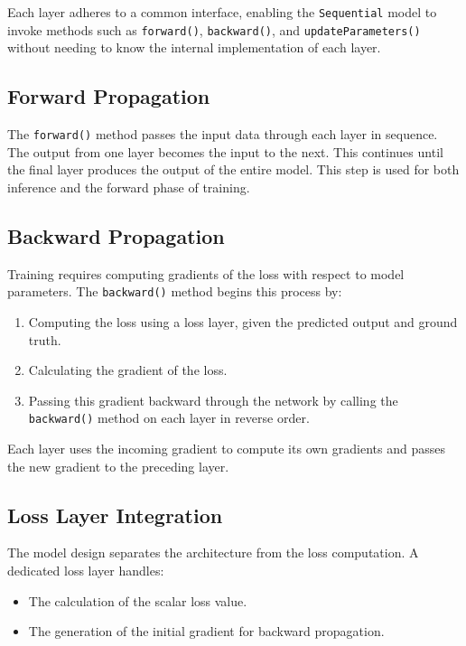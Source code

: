 Each layer adheres to a common interface, enabling the \texttt{Sequential} model to invoke methods such as \texttt{forward()}, \texttt{backward()}, and \texttt{updateParameters()} without needing to know the internal implementation of each layer.

\subsection{Forward Propagation}

The \texttt{forward()} method passes the input data through each layer in sequence. The output from one layer becomes the input to the next. This continues until the final layer produces the output of the entire model. This step is used for both inference and the forward phase of training.

\subsection{Backward Propagation}

Training requires computing gradients of the loss with respect to model parameters. The \texttt{backward()} method begins this process by:
\begin{enumerate}
    \item Computing the loss using a loss layer, given the predicted output and ground truth.
    \item Calculating the gradient of the loss.
    \item Passing this gradient backward through the network by calling the \texttt{backward()} method on each layer in reverse order.
\end{enumerate}

Each layer uses the incoming gradient to compute its own gradients and passes the new gradient to the preceding layer.

\subsection{Loss Layer Integration}

The model design separates the architecture from the loss computation. A dedicated loss layer handles:
\begin{itemize}
    \item The calculation of the scalar loss value.
    \item The generation of the initial gradient for backward propagation.
\end{itemize}

